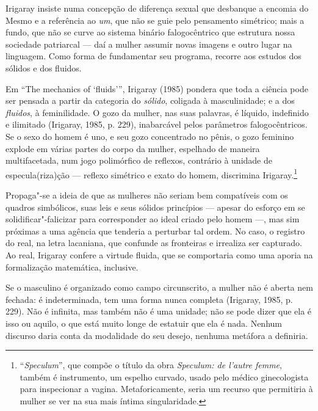 Irigaray insiste numa concepção de diferença sexual que desbanque a
encomia do Mesmo e a referência ao \emph{um}, que não se guie pelo
pensamento simétrico; mais a fundo, que não se curve ao sistema binário
falogocêntrico que estrutura nossa sociedade patriarcal --- daí a mulher
assumir novas imagens e outro lugar na linguagem. Como forma de
fundamentar seu programa, recorre aos estudos dos sólidos e dos fluidos.

Em ``The mechanics of `fluids''', Irigaray (1985) pondera que toda
a ciência pode ser pensada a partir da categoria do \emph{sólido},
coligada à masculinidade; e a dos \emph{fluidos}, à feminilidade. O gozo
da mulher, nas suas palavras, é líquido, indefinido e ilimitado
(Irigaray, 1985, p. 229), inabarcável pelos parâmetros
falogocêntricos. Se o sexo do homem é uno, e seu gozo concentrado no
pênis, o gozo feminino explode em várias partes do corpo da mulher,
espelhado de maneira multifacetada, num jogo polimórfico de reflexos,
contrário à unidade de especula(riza)ção --- reflexo simétrico e exato
do homem, discrimina Irigaray.\footnote{``\emph{Speculum}'', que compõe o
  título da obra \emph{Speculum: de l'autre femme}, também é
  instrumento, um espelho curvado, usado pelo médico ginecologista para
  inspecionar a vagina. Metaforicamente, seria um recurso que permitiria
  à mulher se ver na sua mais íntima singularidade.}

Propaga"-se a ideia de que as mulheres não seriam bem compatíveis com os
quadros simbólicos, suas leis e seus sólidos princípios --- apesar do
esforço em se solidificar"-falicizar para corresponder ao ideal criado
pelo homem ---, mas sim próximas a uma agência que tenderia a perturbar
tal ordem. No caso, o registro do real, na letra lacaniana, que confunde
as fronteiras e irrealiza ser capturado. Ao real, Irigaray confere a
virtude fluida, que se comportaria como uma aporia na formalização
matemática, inclusive.

Se o masculino é organizado como campo circunscrito, a mulher não é
aberta nem fechada: é indeterminada, tem uma forma nunca completa
(Irigaray, 1985, p. 229). Não é infinita, mas também não é uma
unidade; não se pode dizer que ela é isso ou aquilo, o que está muito
longe de estatuir que ela é nada. Nenhum discurso daria conta da
modalidade do seu desejo, nenhuma metáfora a definiria.

